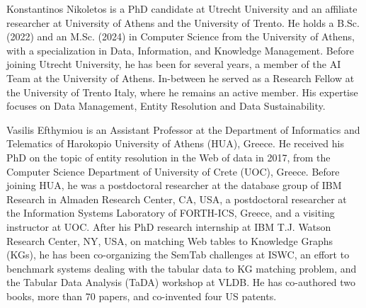 \documentclass{ieeeaccess}
\begin{document}
\begin{IEEEbiography}{Konstantinos Nikoletos} is a PhD candidate at Utrecht University and an affiliate researcher at University of Athens and the University of Trento. He holds a B.Sc. (2022) and an M.Sc. (2024) in Computer Science from the University of Athens, with a specialization in Data, Information, and Knowledge Management. Before joining Utrecht University, he has been for several years, a member of the AI Team at the University of Athens. In-between he served as a Research Fellow at the University of Trento Italy, where he remains an active member. His expertise focuses on Data Management, Entity Resolution and Data Sustainability.
\end{IEEEbiography}
\vspace{-30pt}
\begin{IEEEbiography}{Vasilis Efthymiou} is an Assistant Professor at the Department of Informatics and Telematics of Harokopio University of Athens (HUA), Greece. He received his PhD on the topic of entity resolution in the Web of data in 2017, from the Computer Science Department of University of Crete (UOC), Greece. Before joining HUA, he was a postdoctoral researcher at the database group of IBM Research in Almaden Research Center, CA, USA, a postdoctoral researcher at the Information Systems Laboratory of FORTH-ICS, Greece, and a visiting instructor at UOC. After his PhD research internship at IBM T.J. Watson Research Center, NY, USA, on matching Web tables to Knowledge Graphs (KGs), he has been co-organizing the SemTab challenges at ISWC, an effort to benchmark systems dealing with the tabular data to KG matching problem, and the Tabular Data Analysis (TaDA) workshop at VLDB. He has co-authored two books, more than 70 papers, and co-invented four US patents. 
\end{IEEEbiography}
\vspace{-30pt}
\end{document}
